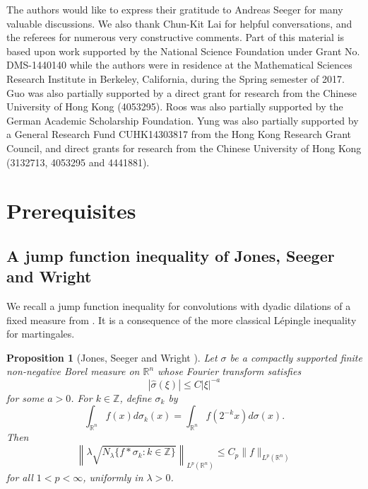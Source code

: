 \documentclass[12pt,leqno]{amsart}
\def\R{\mathbb{R}}
\def\Z{\mathbb{Z}}
\theoremstyle{plain}
\newtheorem{prop}[thm]{Proposition}
\numberwithin{equation}{section}
\begin{document}
 The authors would like to express their gratitude to Andreas Seeger for many valuable discussions. We also thank Chun-Kit Lai for helpful conversations, and the referees for numerous very constructive comments. Part of this material is based upon work supported by the National Science Foundation under Grant No. DMS-1440140 while the authors were in residence at the Mathematical Sciences Research Institute in Berkeley, California, during the Spring semester of 2017. Guo was also partially supported by a direct grant for research from the Chinese University of Hong Kong (4053295). Roos was also partially supported by the German Academic Scholarship Foundation. Yung was also partially supported by a General Research Fund CUHK14303817 from the Hong Kong Research Grant Council, and direct grants for research from the Chinese University of Hong Kong (3132713, 4053295 and 4441881). 

\section{Prerequisites} \label{sect:prelim}

\subsection{A jump function inequality of Jones, Seeger and Wright}

We recall a jump function inequality for convolutions with dyadic dilations of a fixed measure from \cite[Theorem 1.1]{MR2434308}. It is a consequence of the more classical L\'epingle inequality for martingales. 

\begin{prop}[Jones, Seeger and Wright \cite{MR2434308}] \label{prop:Lepingle}
Let $\sigma$ be a compactly supported finite non-negative Borel measure on $\R^n$ whose Fourier transform satisfies
\[|\widehat{\sigma}(\xi)| \leq C |\xi|^{-a}\] for some $a > 0$. For $k \in \Z$, define $\sigma_k$ by 
\[
\int_{\R^n} f(x)d\sigma_k(x)=\int_{\R^n}f(2^{-k} x)d\sigma(x).
\] 
Then 
\[
\left\| \lambda \sqrt{N_{\lambda}\{ f*\sigma_k \colon k \in \Z \}} \right\|_{L^p(\R^n)} \leq C_p \|f\|_{L^p(\R^n)}
\]
for all $1 < p < \infty$, uniformly in $\lambda > 0$.
\end{prop}
\end{document}
